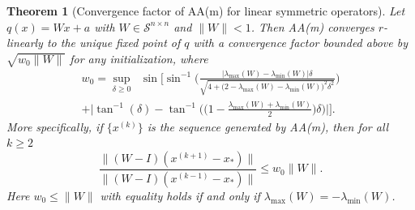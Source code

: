 \documentclass[11pt]{article}
\newtheorem{theorem}{Theorem}%
\newcommand{\bW}{\bm{W}}
\begin{document}
\begin{theorem}[Convergence factor of AA(m) for linear symmetric operators]\label{thm:main1}
Let $q(x) = {W}x + {a}$ with $W \in \mathcal{S}^{n\times n}$ and $\|{W}\|<1$. Then 
AA(m) converges $r$-linearly {\color{black}to the unique fixed point} of $q$ with {\color{black}a convergence factor bounded above} by $\sqrt{w_0 \|W\|}$ for any initialization,
where
{\color{black}
\begin{multline}\label{eq:w0}
w_0 = \sup_{\delta\geq 0}\;\;\sin\!\!\Bigg[\!
\sin^{-1}\!\!\Big(\!\frac{|\lambda_{\max}(W)-\lambda_{\min}(W)|\delta}{\sqrt{\!4+\!\big(2\!-\!\lambda_{\max}(\!W\!)\!-\!\lambda_{\min}(W\!)\big)^2\!\delta^2}}\!\Big)\! \\
+ \Big|\tan^{-1}(\delta)-\tan^{-1}\Big(\big(1-\frac{\lambda_{\max}(W)+\lambda_{\min}(W)}{2}\big)\delta\Big)\Big|\Bigg].
\end{multline}
}
 More specifically, if $\{x^{(k)}\}$ is the sequence generated by AA(m), then for all $k\geq 2$
 \begin{equation}\label{eq:twoiterations}
\frac{\|(W-I)(x^{(k+1)}-x_*)\|}{\|(W-I)(x^{(k-1)}-x_*)\|}\leq w_0 \|W\|.\end{equation}
Here $w_0\leq \|W\|$ 
with equality holds if and only if $\lambda_{\max}(W)= - \lambda_{\min}(W)$.
\end{theorem}
\end{document}
